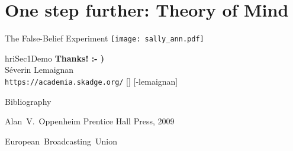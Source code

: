 \documentclass[compress]{beamer}
\begin{document}
\section{One step further: Theory of Mind}



\begin{frame}{The False-Belief Experiment}
    \centering
    \texttt{[image: sally\_ann.pdf]}

\end{frame}







{

\begin{frame}[plain]

    \vspace{8cm}


\begin{beamercolorbox}[wd=\linewidth,ht=6ex,dp=0.7ex]{hriSec1Demo}
    \textbf{Thanks! :- ) }\\
    \scriptsize
    Séverin Lemaignan\\
    {\tt https://academia.skadge.org/} [\faTwitter@skadge]  [\faGithub@severin-lemaignan]
\end{beamercolorbox}
    \vfill
\end{frame}
}




\begin{frame}{Bibliography}
    \begin{thebibliography}{10}

            \beamertemplatebookbibitems
            Alan~V.~Oppenheim
            \newblock {}
            \newblock Prentice Hall Press, 2009

            \beamertemplatearticlebibitems
            European~Broadcasting~Union
            \newblock {}
    \end{thebibliography}
\end{frame}





\end{document}
